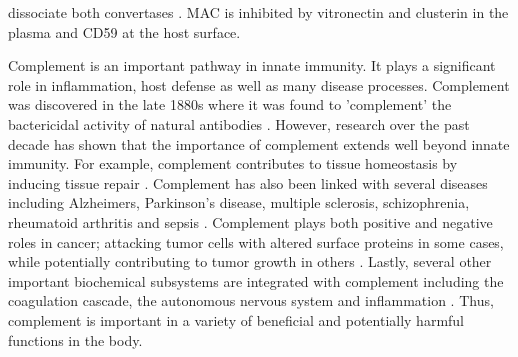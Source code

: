 \documentclass[12pt]{article}
\begin{document}
dissociate both convertases \cite{lukacik2004complement}. MAC is inhibited by vitronectin and clusterin in the plasma and CD59 at the host surface.

Complement is an important pathway in innate immunity. It plays a significant role in inflammation, host defense as well as many disease processes.
Complement was discovered in the late 1880s where it was found to 'complement' the bactericidal activity of natural antibodies \cite{OG_COMPLEMENT_REF}.
However, research over the past decade has shown that the importance of complement extends well beyond innate immunity.
For example, complement contributes to tissue homeostasis by inducing tissue repair \cite{ricklin2010complement}.
Complement has also been linked with several diseases including Alzheimers, Parkinson's disease, multiple sclerosis, schizophrenia, rheumatoid arthritis and sepsis \cite{ricklin2007complement, rittirsch2008harmful}.
Complement plays both positive and negative roles in cancer; attacking tumor cells with altered surface proteins in some cases, while potentially contributing to tumor growth in others \cite{sarma2011complement, ricklin2013complement}.
Lastly, several other important biochemical subsystems are integrated with complement including the coagulation cascade, the autonomous nervous system and inflammation \cite{ricklin2013complement}. Thus, complement is important in a variety of beneficial and potentially harmful functions in the body.
\end{document}

